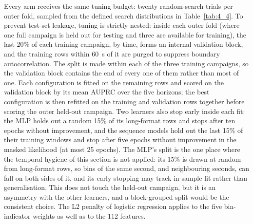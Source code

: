 Every arm receives the same tuning budget: twenty random-search trials per outer fold, sampled from the defined search distributions in Table~\ref{tab:4_4}. To prevent test-set leakage, tuning is strictly nested: inside each outer fold (where one full campaign is held out for testing and three are available for training), the last 20\% of each training campaign, by time, forms an internal validation block, and the training rows within 60~s of it are purged to suppress boundary autocorrelation. The split is made within each of the three training campaigns, so the validation block contains the end of every one of them rather than most of one. Each configuration is fitted on the remaining rows and scored on the validation block by its mean AUPRC over the five horizons; the best configuration is then refitted on the training and validation rows together before scoring the outer held-out campaign. Two learners also stop early inside each fit: the MLP holds out a random 15\% of its long-format rows and stops after ten epochs without improvement, and the sequence models hold out the last 15\% of their training windows and stop after five epochs without improvement in the masked likelihood (at most 25 epochs). The MLP's split is the one place where the temporal hygiene of this section is not applied: its 15\% is drawn at random from long-format rows, so bins of the same second, and neighbouring seconds, can fall on both sides of it, and its early stopping may track in-sample fit rather than generalisation. This does not touch the held-out campaign, but it is an asymmetry with the other learners, and a block-grouped split would be the consistent choice. The L2 penalty of logistic regression applies to the five bin-indicator weights as well as to the 112 features.



